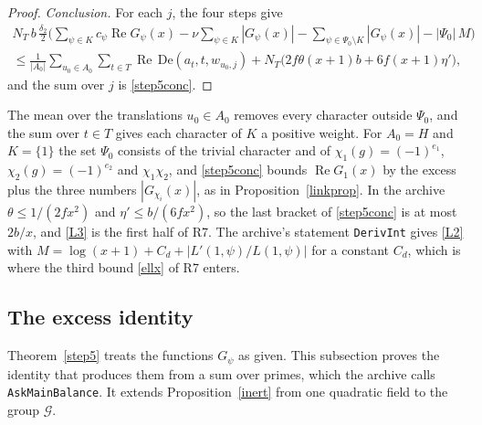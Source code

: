\documentclass[11pt,letterpaper]{article}
\numberwithin{equation}{section}
\begin{document}
\begin{proof}
\emph{Conclusion.} For each $j$, the four steps give
\begin{multline*}
N_T\,b\,\frac{\delta_2}2\Big(\sum_{\psi\in K}c_\psi\operatorname{Re}G_\psi(x)-\nu\sum_{\psi\in K}|G_\psi(x)|-\sum_{\psi\in\Psi_0\setminus K}|G_\psi(x)|-|\Psi_0|\,M\Big)\\
\le\frac1{|A_0|}\sum_{u_0\in A_0}\sum_{t\in T}\operatorname{Re}\,\mathrm{De}(a_t,t,w_{u_0,j})+N_T\Big(2f\theta(x+1)b+6f(x+1)\eta'\Big),
\end{multline*}
and the sum over $j$ is \eqref{step5conc}.
\end{proof}

The mean over the translations $u_0\in A_0$ removes every character outside $\Psi_0$, and the sum over $t\in T$ gives each character of $K$ a positive weight. For $A_0=H$ and $K=\{1\}$ the set $\Psi_0$ consists of the trivial character and of $\chi_1(g)=(-1)^{e_1}$, $\chi_2(g)=(-1)^{e_2}$ and $\chi_1\chi_2$, and \eqref{step5conc} bounds $\operatorname{Re}G_1(x)$ by the excess plus the three numbers $|G_{\chi_i}(x)|$, as in Proposition~\ref{linkprop}. In the archive $\theta\le1/(2fx^2)$ and $\eta'\le b/(6fx^2)$, so the last bracket of \eqref{step5conc} is at most $2b/x$, and \eqref{L3} is the first half of R7. The archive's statement \texttt{DerivInt} gives \eqref{L2} with $M=\log(x+1)+C_d+|L'(1,\psi)/L(1,\psi)|$ for a constant $C_d$, which is where the third bound \eqref{ellx} of R7 enters.

\subsection{The excess identity}\label{sec:excess}

Theorem~\ref{step5} treats the functions $G_\psi$ as given. This subsection proves the identity that produces them from a sum over primes, which the archive calls \texttt{AskMainBalance}. It extends Proposition~\ref{inert} from one quadratic field to the group $\mathcal G$.
\end{document}
